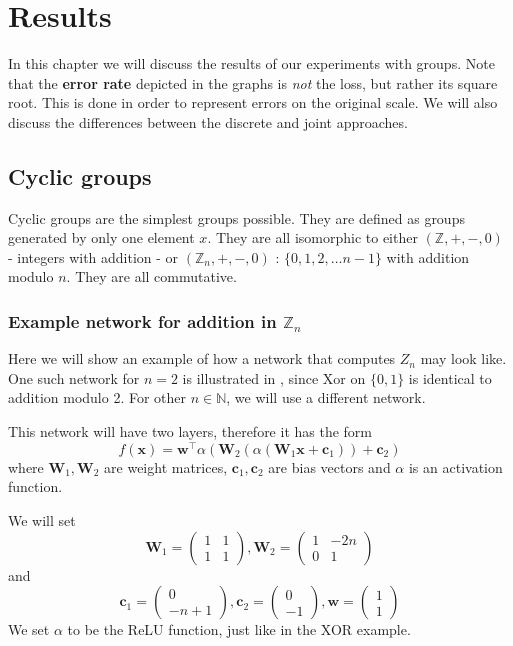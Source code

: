 \chapter{Results}
\label{chapter:results}
In this chapter we will discuss the results of our experiments with groups. Note that the \textbf{error rate} depicted in the graphs is \textit{not} the loss, but rather its square root. This is done in order to represent errors on the original scale. We will also discuss the differences between the discrete and joint approaches.

\section{Cyclic groups}
Cyclic groups are the simplest groups possible. They are defined as groups generated by only one element $x$. They are all isomorphic to either $(\mathbb{Z},+,-,0)$ - integers with addition - or $(\mathbb{Z}_n,+,-,0)$ : $\{0,1,2,\dots n-1\}$ with addition modulo $n$. They are all commutative.

\subsection{Example network for addition in $\mathbb{Z}_n$}
\label{section:addition example}
Here we will show an example of how a network that computes $Z_n$ may look like. One such network for $n=2$ is illustrated in , since Xor on $\{0,1\}$ is identical to addition modulo 2. For other $n\in \mathbb{N}$, we will use a different network.

This network will have two layers, therefore it has the form $$f(\textbf{x})=\textbf{w}^\top \alpha\left(\textbf{W}_2(\alpha(\textbf{W}_1\textbf{x}+\textbf{c}_1))+\textbf{c}_2\right)$$ where $\textbf{W}_1,\textbf{W}_2$ are weight matrices, $\textbf{c}_1,\textbf{c}_2$ are bias vectors and $\alpha$ is an activation function.

We will set 
$$\textbf{W}_1=
	\left(\begin{matrix}
		1 & 1\\
		1 & 1
	\end{matrix}\right), 
\textbf{W}_2=
	\left(\begin{matrix}
		1 & -2n\\
		0 & 1
	\end{matrix}\right)$$
	and
$$\textbf{c}_1=
	\left(\begin{matrix}
		0\\
		-n+1
	\end{matrix}\right),
\textbf{c}_2=
	\left(\begin{matrix}
		0\\
		-1
	\end{matrix}\right),
\textbf{w}=
	\left(\begin{matrix}
		1 \\
		1
	\end{matrix}\right)$$
We set $\alpha$ to be the ReLU function, just like in the XOR example.

